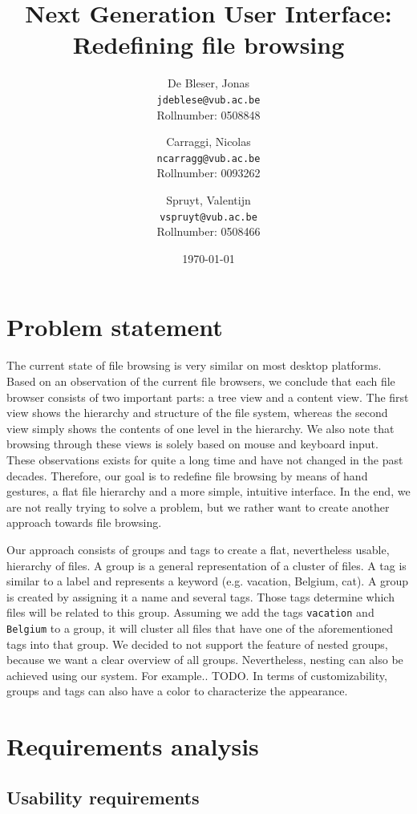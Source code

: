 \documentclass{article}
\title{Next Generation User Interface: \\Redefining file browsing}
\author{
  De Bleser, Jonas\\
  \texttt{jdeblese@vub.ac.be}\\
  Rollnumber: 0508848
  \and
  Carraggi, Nicolas\\
  \texttt{ncarragg@vub.ac.be}\\
  Rollnumber: 0093262
  \and
  Spruyt, Valentijn\\
  \texttt{vspruyt@vub.ac.be}\\
  Rollnumber: 0508466
}
\date{\today}
\begin{document}
\maketitle


\tableofcontents

\section{Problem statement}
The current state of file browsing is very similar on most desktop platforms. Based on an observation of the current file browsers, we conclude that each file browser consists of two important parts: a tree view and a content view. The first view shows the hierarchy and structure of the file system, whereas the second view simply shows the contents of one level in the hierarchy.  We also note that browsing through these views is solely based on mouse and keyboard input. These observations exists for quite a long time and have not changed in the past decades. Therefore, our goal is to redefine file browsing by means of hand gestures, a flat file hierarchy and a more simple, intuitive interface. In the end, we are not really trying to solve a problem, but we rather want to create another approach towards file browsing.

Our approach consists of groups and tags to create a flat, nevertheless usable, hierarchy of files. A group is a general representation of a cluster of files. A tag is similar to a label and represents a keyword (e.g. vacation, Belgium, cat). A group is created by assigning it a name and several tags. Those tags determine which files will be related to this group. Assuming we add the tags \texttt{vacation} and \texttt{Belgium} to a group, it will cluster all files that have one of the aforementioned tags into that group. We decided to not support the feature of nested groups, because we want a clear overview of all groups. Nevertheless, nesting can also be achieved using our system. For example.. TODO. In terms of customizability, groups and tags can also have a color to characterize the appearance.

\section{Requirements analysis}

\subsection{Usability requirements}
\end{document}
